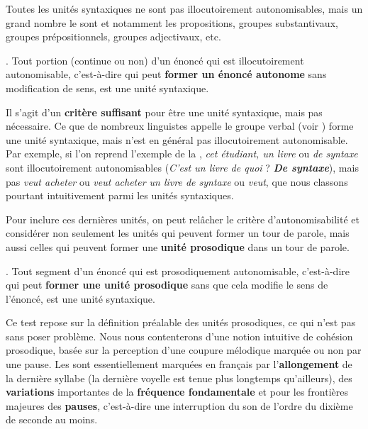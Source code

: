 Toutes les unités syntaxiques ne sont pas illocutoirement autonomisables, mais un grand nombre le sont et notamment les propositions, groupes substantivaux, groupes prépositionnels, groupes adjectivaux, etc.

{. Tout portion (continue ou non) d’un énoncé qui est illocutoirement autonomisable, c’est-à-dire qui peut \textbf{former un énoncé autonome} sans modification de sens, est une unité syntaxique.}

Il s’agit d’un \textbf{critère suffisant} pour être une unité syntaxique, mais pas nécessaire. Ce que de nombreux linguistes appelle le groupe verbal (voir ) forme une unité syntaxique, mais n’est en général pas illocutoirement autonomisable. Par exemple, si l’on reprend l’exemple de la , \textit{cet étudiant, un livre} ou \textit{de syntaxe} sont illocutoirement autonomisables (\textit{C’est un livre de quoi} ? \textbf{\textit{De syntaxe}}), mais pas \textit{veut acheter} ou \textit{veut acheter un livre de syntaxe} ou \textit{veut}, que nous classons pourtant intuitivement parmi les unités syntaxiques.

Pour inclure ces dernières unités, on peut relâcher le critère d’autonomisabilité et considérer non seulement les unités qui peuvent former un tour de parole, mais aussi celles qui peuvent former une \textbf{unité prosodique} dans un tour de parole.

{. Tout segment d’un énoncé qui est prosodiquement autonomisable, c’est-à-dire qui peut \textbf{former une unité prosodique} sans que cela modifie le sens de l’énoncé, est une unité syntaxique.}

Ce test repose sur la définition préalable des unités prosodiques, ce qui n’est pas sans poser problème. Nous nous contenterons d’une notion intuitive de cohésion prosodique, basée sur la perception d’une coupure mélodique marquée ou non par une pause. Les  sont essentiellement marquées en français par l’\textbf{allongement} de la dernière syllabe (la dernière voyelle est tenue plus longtemps qu’ailleurs), des \textbf{variations} importantes de la \textbf{fréquence fondamentale} et pour les frontières majeures des \textbf{pauses}, c’est-à-dire une interruption du son de l’ordre du dixième de seconde au moins.

